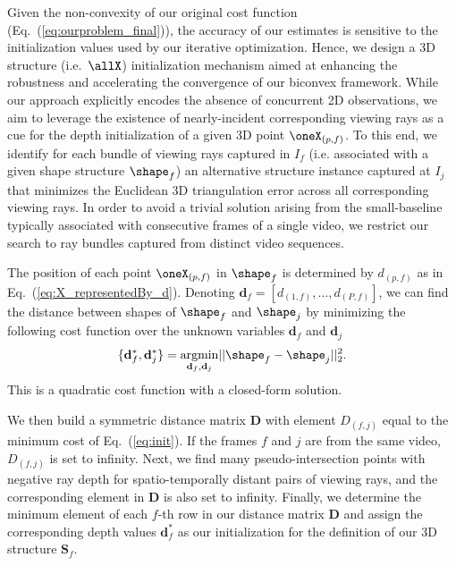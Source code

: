 Given the non-convexity of our original cost function (Eq.~(\ref{eq:ourproblem_final})), the accuracy of our estimates is  sensitive to the initialization values used by our iterative optimization. 
Hence, we design a 3D structure (i.e.~$\allX$) initialization mechanism aimed at
enhancing the robustness and accelerating the convergence of our biconvex framework.
While our approach explicitly encodes the absence of concurrent 2D observations, we aim to leverage the existence of nearly-incident corresponding viewing rays as a cue for the depth initialization of a given 3D point $\oneX_{(p,f)}$.
To this end, we identify for each bundle of viewing rays captured in $I_f$ (i.e. associated with a given shape structure $\shape_f$) an alternative structure instance captured at $I_j$ that minimizes the Euclidean 3D triangulation error across all corresponding viewing rays. In order to avoid a trivial solution arising from the small-baseline typically associated with consecutive frames of a single video, we restrict our search to ray bundles captured from distinct video sequences.

The position of each point $\oneX_{(p,f)}$ in $\shape_f$ is determined by $d_{(p,f)}$ as in Eq.~(\ref{eq:X_representedBy_d}).
Denoting $\mathbf{d}_f = [d_{(1,f)}, \dots, d_{(P,f)} ]$, we can find the  distance between
shapes of $\shape_f$ and $\shape_j$ by minimizing the following cost function over the unknown variables $\mathbf{d}_f$ and $\mathbf{d}_j$
\begin{equation}
\{\mathbf{d}_f^*,\mathbf{d}_j^*\} =  \underset{\mathbf{d}_f,\mathbf{d}_j } {\text{argmin}} ||\shape_f - \shape_j ||_2^2.
\label{eq:init}
\end{equation}
This is a quadratic cost function with a closed-form solution. %

We then build a symmetric distance matrix $\mathbf{D}$ with element $D_{(f,j)}$ equal to the minimum cost of Eq.~(\ref{eq:init}).
If the frames $f$ and $j$ are from the same video, $D_{(f,j)}$ is set to infinity.
Next, we find many pseudo-intersection points with negative ray depth for spatio-temporally distant pairs of viewing rays, and the corresponding element in $\mathbf{D}$ is also set to infinity.
Finally, we determine the minimum element of each $f$-th row in our distance matrix $\mathbf{D}$ and assign the corresponding depth values $\mathbf d^*_f$ as our initialization for the definition of our 3D structure $\mathbf{S}_f$.

